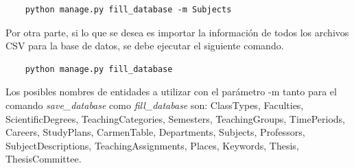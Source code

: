\begin{verbatim}
    python manage.py fill_database -m Subjects
\end{verbatim}

Por otra parte, si lo que se desea es importar la información de todos los archivos CSV  
para la base de datos, se debe ejecutar el siguiente comando.

\begin{verbatim}
    python manage.py fill_database
\end{verbatim}


Los posibles nombres de entidades a utilizar con
el parámetro -m tanto para el comando 
\textit{save\_database} como \textit{fill\_database} son:
ClassTypes, Faculties,
ScientificDegrees, TeachingCategories,
Semesters, TeachingGroups, TimePeriods,
Careers, StudyPlans, CarmenTable, Departments,
Subjects, Professors, SubjectDescriptions, TeachingAssignments,
Places, Keywords, Thesis, ThesisCommittee.




